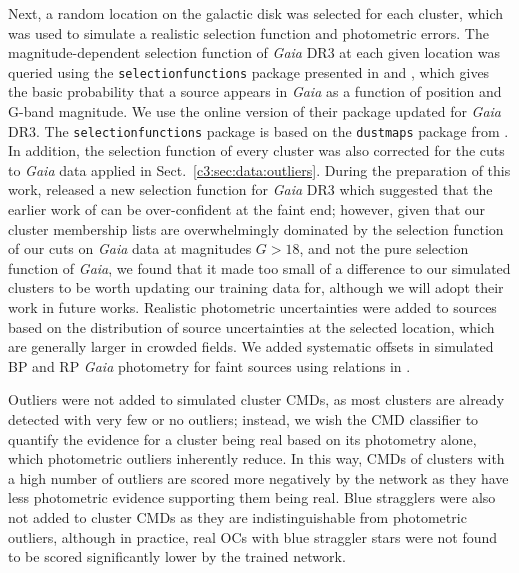 Next, a random location on the galactic disk was selected for each cluster, which was used to simulate a realistic selection function and photometric errors. The magnitude-dependent selection function of \emph{Gaia} DR3 at each given location was queried using the \texttt{selectionfunctions} package presented in \cite{boubert_completeness_2020} and \cite{boubert_completeness_2020-1}, which gives the basic probability that a source appears in \emph{Gaia} as a function of position and G-band magnitude. We use the online version of their package updated for \emph{Gaia} DR3. The \texttt{selectionfunctions} package is based on the \texttt{dustmaps} package from \cite{green_dustmaps_2018}. In addition, the selection function of every cluster was also corrected for the cuts to \emph{Gaia} data applied in Sect.~\ref{c3:sec:data:outliers}. During the preparation of this work, \cite{cantat-gaudin_empirical_model_2023} released a new selection function for \emph{Gaia} DR3 which suggested that the earlier work of \cite{boubert_completeness_2020, boubert_completeness_2020-1} can be over-confident at the faint end; however, given that our cluster membership lists are overwhelmingly dominated by the selection function of our cuts on \emph{Gaia} data at magnitudes $G>18$, and not the pure selection function of \emph{Gaia}, we found that it made too small of a difference to our simulated clusters to be worth updating our training data for, although we will adopt their work in future works. Realistic photometric uncertainties were added to sources based on the distribution of source uncertainties at the selected location, which are generally larger in crowded fields. We added systematic offsets in simulated BP and RP \emph{Gaia} photometry for faint sources using relations in \cite{riello_gaia_2021}. 

Outliers were not added to simulated cluster CMDs, as most clusters are already detected with very few or no outliers; instead, we wish the CMD classifier to quantify the evidence for a cluster being real based on its photometry alone, which photometric outliers inherently reduce. In this way, CMDs of clusters with a high number of outliers are scored more negatively by the network as they have less photometric evidence supporting them being real. Blue stragglers were also not added to cluster CMDs as they are indistinguishable from photometric outliers, although in practice, real OCs with blue straggler stars were not found to be scored significantly lower by the trained network.


